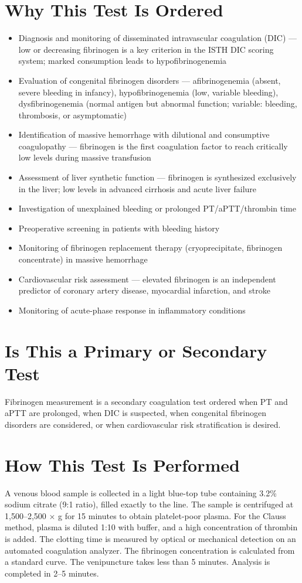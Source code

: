 \section*{Why This Test Is Ordered}
\begin{itemize}
  \item Diagnosis and monitoring of disseminated intravascular coagulation (DIC) --- low or decreasing fibrinogen is a key criterion in the ISTH DIC scoring system; marked consumption leads to hypofibrinogenemia
  \item Evaluation of congenital fibrinogen disorders --- afibrinogenemia (absent, severe bleeding in infancy), hypofibrinogenemia (low, variable bleeding), dysfibrinogenemia (normal antigen but abnormal function; variable: bleeding, thrombosis, or asymptomatic)
  \item Identification of massive hemorrhage with dilutional and consumptive coagulopathy --- fibrinogen is the first coagulation factor to reach critically low levels during massive transfusion
  \item Assessment of liver synthetic function --- fibrinogen is synthesized exclusively in the liver; low levels in advanced cirrhosis and acute liver failure
  \item Investigation of unexplained bleeding or prolonged PT/aPTT/thrombin time
  \item Preoperative screening in patients with bleeding history
  \item Monitoring of fibrinogen replacement therapy (cryoprecipitate, fibrinogen concentrate) in massive hemorrhage
  \item Cardiovascular risk assessment --- elevated fibrinogen is an independent predictor of coronary artery disease, myocardial infarction, and stroke
  \item Monitoring of acute-phase response in inflammatory conditions
\end{itemize}

\section*{Is This a Primary or Secondary Test}
Fibrinogen measurement is a secondary coagulation test ordered when PT and aPTT are prolonged, when DIC is suspected, when congenital fibrinogen disorders are considered, or when cardiovascular risk stratification is desired.

\section*{How This Test Is Performed}
A venous blood sample is collected in a light blue-top tube containing 3.2\% sodium citrate (9:1 ratio), filled exactly to the line. The sample is centrifuged at 1,500--2,500 $\times$ g for 15 minutes to obtain platelet-poor plasma. For the Clauss method, plasma is diluted 1:10 with buffer, and a high concentration of thrombin is added. The clotting time is measured by optical or mechanical detection on an automated coagulation analyzer. The fibrinogen concentration is calculated from a standard curve. The venipuncture takes less than 5 minutes. Analysis is completed in 2--5 minutes.

